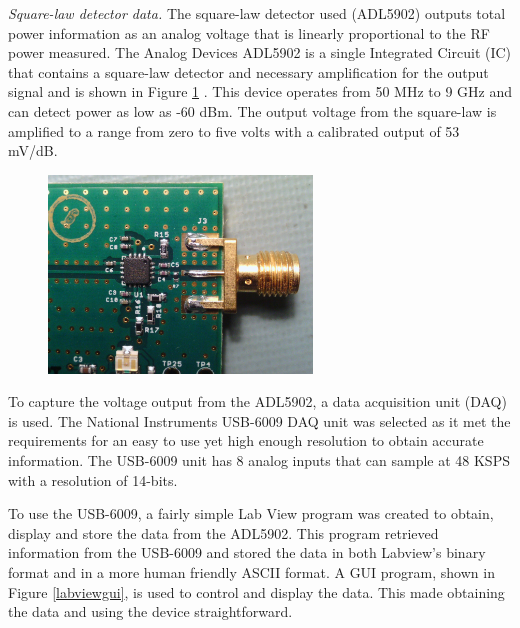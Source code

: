 \emph{Square-law detector data.}  The square-law detector used (ADL5902) outputs total power information as an analog voltage that is linearly proportional to the RF power measured.  The Analog Devices ADL5902 is a single Integrated Circuit (IC) that contains a square-law detector and necessary amplification for the output signal and is shown in Figure \ref{square_law} .  This device operates from 50 MHz to 9 GHz and can detect power as low as -60 dBm.  The output voltage from the square-law is amplified to a range from zero to five volts with a calibrated output of 53 mV/dB.  

{\begin{figure}[h!tb] \centering
\includegraphics[width=7cm]{Images/adl5902.jpg}
\label{square_law}
\end{figure}
}

To capture the voltage output from the ADL5902, a data acquisition unit (DAQ) is used.  The National Instruments USB-6009 DAQ unit was selected as it met the requirements for an easy to use yet high enough resolution to obtain accurate information.  The USB-6009 unit has 8 analog inputs that can sample at 48 KSPS with a resolution of 14-bits.  

To use the USB-6009, a fairly simple Lab View program was created to obtain, display and store the data from the ADL5902.  This program retrieved information from the USB-6009 and stored the data in both Labview's binary format and in a more human friendly ASCII format.  A GUI program, shown in Figure \ref{labviewgui}, is used to control and display the data.  This made obtaining the data and using the device straightforward.


